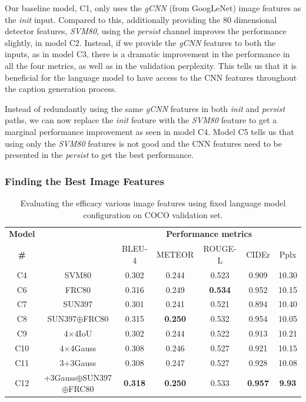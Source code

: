 Our baseline model, C1, only uses the \emph{gCNN} (from GoogLeNet) image
features as the \emph{init} input.
Compared to this, additionally providing the 80 dimensional detector features,
\emph{SVM80},
using the \emph{persist} channel improves the performance slightly, in model C2.
Instead, if we provide the \emph{gCNN} features to both the inputs, as in model C3,
there is a dramatic improvement in the performance in all the four metrics, as
well as in the validation perplexity.
This tells us that it is beneficial for the language model to have access to the
CNN features throughout the caption generation process.

Instead of redundantly using the same \emph{gCNN} features in both \emph{init} and
\emph{persist} paths, we can now replace the \emph{init} feature with the \emph{SVM80}
feature to get a marginal performance improvement as seen in model C4.
Model C5 tells us that using only the \emph{SVM80} features is not good and the CNN
features need to be presented in the \emph{persist} to get the best performance. 

\subsubsection{Finding the Best Image Features}
\begin{table}[tbh]
  \centering
  \newcommand{\bs}{\small}
  \begin{adjustbox}{center}
  \begin{tabular}{|c|c|c|c|c|c|c|}
    \hline
    \bf Model & \bf \multirow{2}{*}{Init feature} & \multicolumn{5}{c|}{\bf Performance metrics}\\
    \cline{3-7}
    \bf \# &\bf &\bs BLEU-4 &\bs METEOR &\bs ROUGE-L &\bs CIDEr&\bs Pplx \\\hline
    C4 & SVM80               & 0.302 & 0.244 & 0.523 & 0.909 & 10.30  \\
    C6 & FRC80               & 0.316 & 0.249 &\bf0.534 & 0.952 & 10.15  \\
    C7 & SUN397              & 0.301 & 0.241 & 0.521 & 0.894 & 10.40  \\
    C8 & SUN397$\oplus$FRC80 & 0.315 &\bf0.250 & 0.532 &0.954 &10.05  \\\hline
    C9 & 4$\times$4IoU       & 0.302 & 0.244 & 0.522 & 0.913 & 10.21  \\
    C10 & 4$\times$4Gauss    & 0.308 & 0.246 & 0.527 & 0.921 & 10.15  \\
    C11 & 3+3Gauss           & 0.308 & 0.247 & 0.527 & 0.928 & 10.08  \\\hline
    C12 &\parbox[c][][c]{4cm}{\smallskip{}+3Gauss$\oplus$SUN397\\$\oplus$FRC80\smallskip} 
                             &\bf0.318&\bf0.250&0.533 &\bf0.957&\bf9.93\\\hline
  \end{tabular}
  \end{adjustbox}
  \caption{Evaluating the efficacy various image features using fixed language model
          configuration on COCO validation set.}
  \label{tab:resCocFeatExpt}
\end{table}

